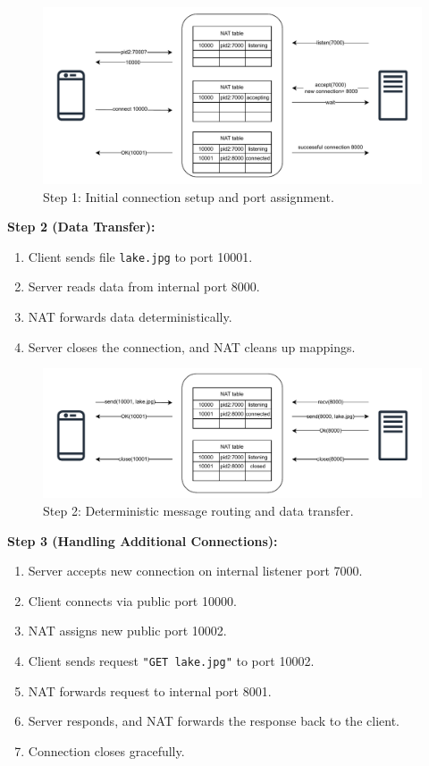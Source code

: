 \documentclass[10pt]{IEEEtran}
\begin{document}
\begin{figure}[h]
\centering
\includegraphics[width=0.9\linewidth]{consensus_diagram_1.pdf}
\caption{Step 1: Initial connection setup and port assignment.}
\label{fig:consensus-1}
\end{figure}

\textbf{Step 2 (Data Transfer):}
\begin{enumerate}
\item Client sends file \texttt{lake.jpg} to port 10001.
\item Server reads data from internal port 8000.
\item NAT forwards data deterministically.
\item Server closes the connection, and NAT cleans up mappings.
\end{enumerate}

\begin{figure}[h]
\centering
\includegraphics[width=0.9\linewidth]{consensus_diagram_2.pdf}
\caption{Step 2: Deterministic message routing and data transfer.}
\label{fig:consensus-2}
\end{figure}

\textbf{Step 3 (Handling Additional Connections):}
\begin{enumerate}
\item Server accepts new connection on internal listener port 7000.
\item Client connects via public port 10000.
\item NAT assigns new public port 10002.
\item Client sends request \texttt{"GET lake.jpg"} to port 10002.
\item NAT forwards request to internal port 8001.
\item Server responds, and NAT forwards the response back to the client.
\item Connection closes gracefully.
\end{enumerate}
\end{document}
